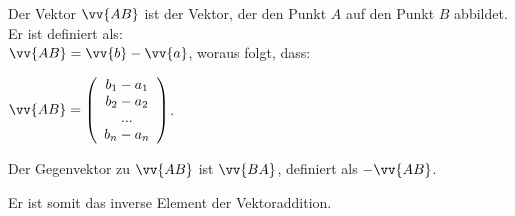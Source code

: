 \documentclass[main.tex]{subfiles}
\begin{document}
      \begin{Definition}
        Der Vektor $\vv{AB}$ ist der Vektor, der den Punkt $A$ auf den Punkt $B$ abbildet. Er ist definiert als:\\ $\vv{AB}=\vv{b}-\vv{a}$,
        woraus folgt, dass: \begin{center} $\vv{AB} = \left(\begin{array}{c} b_1 - a_1 \\ b_2 - a_2 \\ ... \\ b_n - a_n \end{array}\right)$. \end{center}
      \end{Definition}

      \begin{Definition}
        Der Gegenvektor zu $\vv{AB}$ ist $\vv{BA}$, definiert als  $-\vv{AB}$.\\

      \end{Definition}

      \begin{Bemerkung}
        Er ist somit das inverse Element der Vektoraddition.
      \end{Bemerkung}
\end{document}
